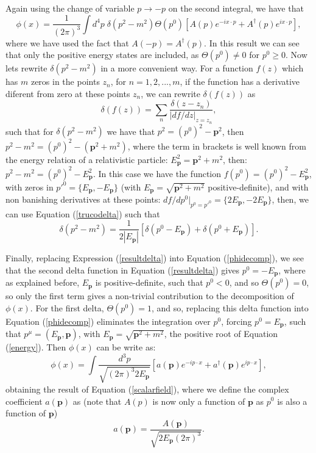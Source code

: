 Again using the change of variable $p\rightarrow -p$ on the second integral, we have that
\begin{equation}
\label{phidecomp}
    \phi(x) = \dfrac{1}{(2\pi)^3}\int d^4p \; \delta(p^2 - m^2)\Theta(p^0) \left[ A(p)e^{-ix\cdot p} + A^{\dagger}(p)e^{ix\cdot p} \right],
\end{equation}
where we have used the fact that $A(-p) = A^{\dagger}(p)$. In this result we can see that only the positive energy states are included, as $\Theta(p^0)\neq0$ for $p^0\geq0$. Now lets rewrite $\delta(p^2 - m^2)$ in a more convenient way. For a function $f(z)$ which has $m$ zeros in the points $z_n$, for $n = 1, 2, ..., m$, if the function has a derivative diferent from zero at these points $z_n$, we can rewrite $\delta(f(z))$ as
\begin{equation}
\label{trucodelta}
    \delta(f(z)) = \sum_n \dfrac{\delta(z-z_n)}{|df/dz|_{z=z_n}},
\end{equation}
such that for $\delta(p^2 - m^2)$ we have that $p^2 = (p^0)^2 - \bm{p}^2$, then $p^2 - m^2 = (p^0)^2 - (\bm{p}^2 + m^2)$, where the term in brackets is well known from the energy relation of a relativistic particle: $E_{\bm{p}}^2 = \bm{p}^2 + m^2$, then: $p^2 - m^2 = (p^0)^2 - E_{\bm{p}}^2$. In this case we have the function $f(p^0)=(p^0)^2 - E_{\bm{p}}^2$, with zeros in $p'^0=\{E_{\bm{p}}, -E_{\bm{p}}\}$ (with $E_{\bm{p}} = \sqrt{\bm{p}^2 + m^2}$ positive-definite), and with non banishing derivatives at these points: $df/dp^0 |_{p^0=p'^0}=\{2E_{\bm{p}}, -2E_{\bm{p}}\}$, then, we can use Equation (\ref{trucodelta}) such that
\begin{equation}
\label{resultdelta}
    \delta(p^2 - m^2) = \dfrac{1}{2|E_{\bm{p}}|}[\delta(p^0 - E_{\bm{p}}) + \delta(p^0 + E_{\bm{p}})].
\end{equation}

Finally, replacing Expression (\ref{resultdelta}) into Equation (\ref{phidecomp}), we see that the second delta function in Equation (\ref{resultdelta}) gives $p^0 = -E_{\bm{p}}$, where as explained before, $E_{\bm{p}}$ is positive-definite, such that $p^0 < 0$, and so $\Theta(p^0) = 0$, so only the first term gives a non-trivial contribution to the decomposition of $\phi(x)$. For the first delta, $\Theta(p^0) = 1$, and so, replacing this delta function into Equation (\ref{phidecomp}) eliminates the integration over $p^0$, forcing $p^0=E_{\bm{p}}$, such that $p^{\mu} = (E_{\bm{p}},\bm{p})$, with $E_{\bm{p}}=\sqrt{\bm{p}^2 + m^2}$, the positive root of Equation (\ref{energy}). Then $\phi(x)$ can be write as:
\begin{equation*}
    \phi(x) = \int \dfrac{d^3p}{\sqrt{(2\pi)^{3}2E_{\bm{p}}}} [a(\bm{p})e^{-ip\cdot x} + a^{\dagger}(\bm{p})e^{ip\cdot x}],
\end{equation*}
obtaining the result of Equation (\ref{scalarfield}), where we define the complex coefficient $a(\bm{p})$ as (note that $A(p)$ is now only a function of $\bm{p}$ as $p^0$ is also a function of $\bm{p}$)
\begin{equation*}
    a(\bm{p}) = \dfrac{A(\bm{p})}{\sqrt{2E_{\bm{p}}(2\pi)^3}}.
\end{equation*}

